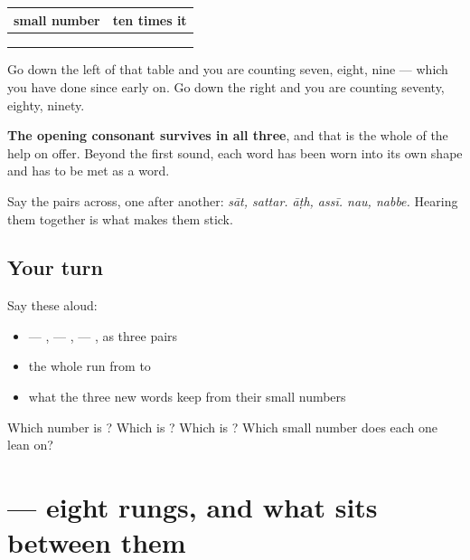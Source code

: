 \begin{grammarlens}[title={Grammar Lens: each one leans on a number you already count}]
\noindent
\begin{tabularx}{\linewidth}{@{}>{\raggedright\arraybackslash}X>{\raggedright\arraybackslash}X@{}}
\toprule
\textbf{small number} & \textbf{ten times it} \\
\midrule
\hi{सात} & \hi{सत्तर} \\
\hi{आठ} & \hi{अस्सी} \\
\hi{नौ} & \hi{नब्बे} \\
\bottomrule
\end{tabularx}

Go down the left of that table and you are counting seven, eight, nine — which you have done since early on. Go down the right and you are counting seventy, eighty, ninety.

\textbf{The opening consonant survives in all three}, and that is the whole of the help on offer. Beyond the first sound, each word has been worn into its own shape and has to be met as a word.

Say the pairs across, one after another: \emph{sāt, sattar. āṭh, assī. nau, nabbe.} Hearing them together is what makes them stick.
\end{grammarlens}

\subsection*{Your turn}
Say these aloud:

\begin{itemize}
\raggedright
  \item {} — ,  — ,  — , as three pairs
  \item the whole run from  to 
  \item what the three new words keep from their small numbers
\end{itemize}

\begin{tcolorbox}[breakable,colback=teal!4,colframe=teal!35!black,title={Before you move on}]
Which number is \textbf{}? Which is \textbf{}? Which is \textbf{}? Which small number does each one lean on?
\end{tcolorbox}
\section[\texorpdfstring{\hi{गिनती} \hi{की} \hi{तालिका} (gintī kī tālikā)}{गिनती की तालिका (gintī kī tālikā)}]{   — eight rungs, and what sits between them}

